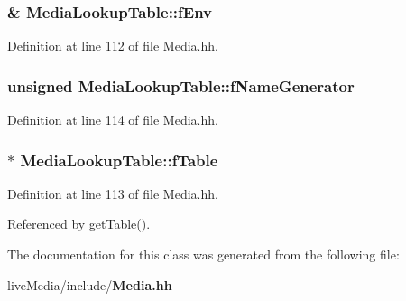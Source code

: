 \subsubsection[{f\+Env}]{\& Media\+Lookup\+Table\+::f\+Env\hspace{0.3cm}{\ttfamily [private]}}\label{classMediaLookupTable_afaa229b8a07e915890450099a08b5975}


Definition at line 112 of file Media.\+hh.

\subsubsection[{f\+Name\+Generator}]{\setlength{\rightskip}{0pt plus 5cm}unsigned Media\+Lookup\+Table\+::f\+Name\+Generator\hspace{0.3cm}{\ttfamily [private]}}\label{classMediaLookupTable_a585c7c57d4bedb8b11b89850835583c7}


Definition at line 114 of file Media.\+hh.

\subsubsection[{f\+Table}]{$\ast$ Media\+Lookup\+Table\+::f\+Table\hspace{0.3cm}{\ttfamily [private]}}\label{classMediaLookupTable_abef406482a4763a0bce45832ed1cb2fe}


Definition at line 113 of file Media.\+hh.



Referenced by get\+Table().



The documentation for this class was generated from the following file\+:\begin{DoxyCompactItemize}
\item 
live\+Media/include/{\bf Media.\+hh}\end{DoxyCompactItemize}
